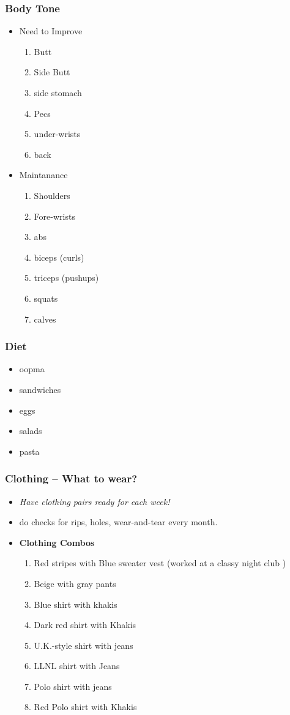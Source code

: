 \begin{frame}
\frametitle{Body Tone}
\begin{itemize}
\item Need to Improve
\begin{enumerate}
\item \tiny Butt
\item  \tiny Side Butt
\item \tiny side stomach
\item \tiny Pecs
\item \tiny under-wrists
\item \tiny back
\end{enumerate}
\item Maintanance
\begin{enumerate}
\item \tiny Shoulders
\item \tiny Fore-wrists
\item \tiny abs
\item \tiny biceps (curls)
\item \tiny triceps (pushups)
\item \tiny squats
\item \tiny calves
\end{enumerate}
\end{itemize}
\end{frame}

\begin{frame}
\frametitle{Diet}
\begin{itemize}
\item oopma
\item sandwiches
\item eggs
\item salads
\item pasta
\end{itemize}
\end{frame}

\begin{frame}
\frametitle{Clothing -- What to wear?}
\begin{itemize}
\item \tiny \textit{Have clothing pairs ready for each week!}
\item \tiny do checks for rips, holes, wear-and-tear every month.
\item \tiny \textbf{Clothing Combos}
\begin{enumerate}
\item \tiny Red stripes with Blue sweater vest (worked at a classy night club  )
\item \tiny Beige with gray pants
\item \tiny Blue shirt with khakis
\item \tiny Dark red shirt with Khakis
\item \tiny U.K.-style shirt with jeans
\item \tiny LLNL shirt with Jeans
\item \tiny Polo shirt with jeans
\item \tiny Red Polo shirt with Khakis
\end{enumerate}
\end{itemize}
\end{frame}

